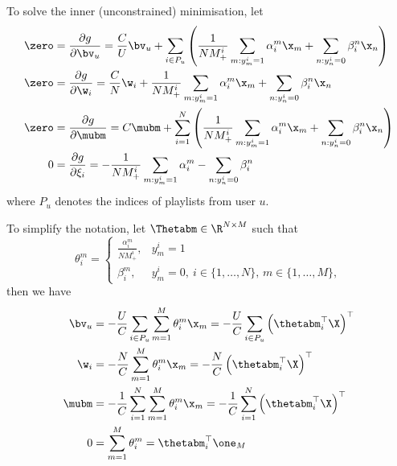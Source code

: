To solve the inner (unconstrained) minimisation, let
\begin{equation*}
\begin{aligned}
\zero &= \frac{\partial g}{\partial \bv_u} 
       = \frac{C}{U} \bv_u 
         + \sum_{i \in P_u} \left( \frac{1}{N M_+^i} \sum_{m: y_m^i = 1} \alpha_i^m \x_m + \sum_{n: y_n^i = 0} \beta_i^n \x_n \right) \\
\zero &= \frac{\partial g}{\partial \w_i}
       = \frac{C}{N} \w_i + \frac{1}{N M_+^i} \sum_{m: y_m^i = 1} \alpha_i^m \x_m + \sum_{n: y_n^i = 0} \beta_i^n \x_n \\
\zero &= \frac{\partial g}{\partial \mubm} 
       = C \mubm + \sum_{i=1}^N \left( \frac{1}{N M_+^i} \sum_{m: y_m^i = 1} \alpha_i^m \x_m + \sum_{n: y_n^i = 0} \beta_i^n \x_n \right) \\
0     &= \frac{\partial g}{\partial \xi_i}
       = - \frac{1}{N M_+^i} \sum_{m: y_m^i = 1} \alpha_i^m - \sum_{n: y_n^i = 0} \beta_i^n \\
\end{aligned}
\end{equation*}
where $P_u$ denotes the indices of playlists from user $u$.

To simplify the notation, let $\Thetabm \in \R^{N \times M}$ such that
\begin{equation*}
\theta_i^m = 
\begin{cases}
    \frac{\alpha_i^m}{N M_+^i}, & y_m^i = 1 \\
    \beta_i^m, & y_m^i = 0, \ i \in \{1,\dots,N\}, \, m \in \{1,\dots,M\},
\end{cases}
\end{equation*}
then we have
\begin{equation}
\label{eq:dual2primal}
\begin{aligned}
\bv_u
&= -\frac{U}{C} \sum_{i \in P_u} \sum_{m=1}^M \theta_i^m \x_m
 = -\frac{U}{C} \sum_{i \in P_u} \left( \thetabm_i^\top \X \right)^\top \\
%
\w_i
&= -\frac{N}{C} \sum_{m=1}^M \theta_i^m \x_m
 = -\frac{N}{C} \left( \thetabm_i^\top \X \right)^\top \\
%
\mubm
&= -\frac{1}{C} \sum_{i=1}^N \sum_{m=1}^M \theta_i^m \x_m 
 = -\frac{1}{C} \sum_{i=1}^N \left( \thetabm_i^\top \X \right)^\top \\
%
0
&= \sum_{m=1}^M \theta_i^m 
 = \thetabm_i^\top \one_M
\end{aligned}
\end{equation}

